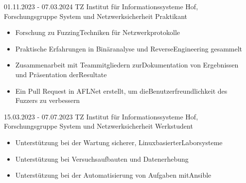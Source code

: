 \pagebreak
\jobentry
{01.11.2023 - 07.03.2024}
{TZ}
{Institut für Informationssysteme Hof, \\ Forschungsgruppe System\- und Netzwerksicherheit\newline}
{Praktikant}
{\vspace{-1\baselineskip}
    \begin{itemize}
        \item Forschung zu Fuzzing\-Techniken für Netzwerkprotokolle
        \item Praktische Erfahrungen in Binäranalyse und Reverse\newline Engineering gesammelt
        \item Zusammenarbeit mit Teammitgliedern zur\newline Dokumentation von Ergebnissen und Präsentation der\newline Resultate
        \item Ein Pull Request in AFL\-Net erstellt, um die\newline Benutzerfreundlichkeit des Fuzzers zu verbessern
    \end{itemize}
}

\jobentry
{15.03.2023 - 07.07.2023}
{TZ}
{Institut für Informationssysteme Hof, \\ Forschungsgruppe System\- und Netzwerksicherheit\newline}
{Werkstudent}
{\vspace{-1\baselineskip}
    \begin{itemize}
        \item Unterstützung bei der Wartung sicherer, Linux\-basierter\newline Laborsysteme
        \item Unterstützung bei Versuchsaufbauten und Datenerhebung
        \item Unterstützung bei der Automatisierung von Aufgaben mit\newline Ansible
    \end{itemize}
}